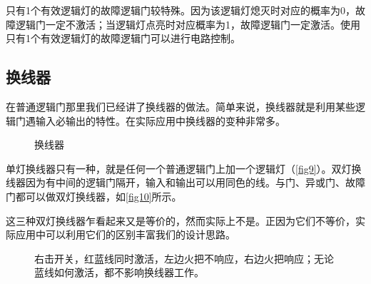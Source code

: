 只有1个有效逻辑灯的故障逻辑门较特殊。因为该逻辑灯熄灭时对应的概率为0，故障逻辑门一定不激活；当逻辑灯点亮时对应概率为1，故障逻辑门一定激活。使用只有1个有效逻辑灯的故障逻辑门可以进行电路控制。

\subsection{换线器}
在普通逻辑门那里我们已经讲了换线器的做法。简单来说，换线器就是利用某些逻辑门遇输入必输出的特性。在实际应用中换线器的变种非常多。

\begin{figure}[!ht]
\centering
{}
\qquad
{}
\caption{换线器}
\end{figure}

单灯换线器只有一种，就是任何一个普通逻辑门上加一个逻辑灯（\autoref{fig9}）。双灯换线器因为有中间的逻辑门隔开，输入和输出可以用同色的线。与门、异或门、故障门都可以做双灯换线器，如\autoref{fig10}所示。

这三种双灯换线器乍看起来又是等价的，然而实际上不是。正因为它们不等价，实际应用中可以利用它们的区别丰富我们的设计思路。

\begin{figure}[!ht]
\centering
{}
\qquad
{}
\caption{\protect{}右击开关，红蓝线同时激活，左边火把不响应，右边火把响应；\protect{}无论蓝线如何激活，都不影响换线器工作。}
\end{figure}

